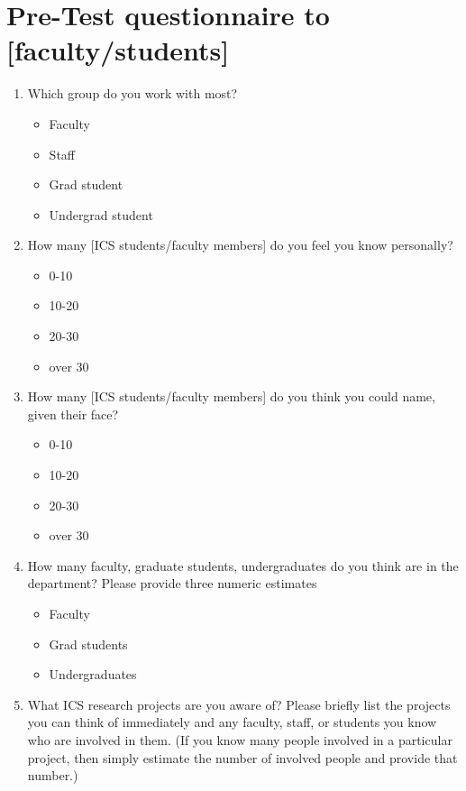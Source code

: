 \section{Pre-Test questionnaire to [faculty/students]}
\label{Pre-Test}
\begin{enumerate}

\item{Which group do you work with most?}
  \begin{itemize}
  \item{Faculty}
  \item{Staff}
  \item{Grad student}
  \item{Undergrad student}
  \end{itemize}

\item{How many [ICS students/faculty members] do you feel you know
  personally?}
  \begin{itemize}
  \item{0-10}
  \item{10-20}
  \item{20-30}
  \item{over 30}
  \end{itemize}

\item{How many [ICS students/faculty members] do you think you could name,
  given their face?}
  \begin{itemize}
  \item{0-10}
  \item{10-20}
  \item{20-30}
  \item{over 30}
  \end{itemize}

\item{How many faculty, graduate students, undergraduates do you think are
  in the department?  Please provide three numeric estimates}
  \begin{itemize}
  \item{Faculty}
  \item{Grad students}
  \item{Undergraduates}
  \end{itemize}

\item{What ICS research projects are you aware of?  Please briefly list the
  projects you can think of immediately and any faculty, staff, or students
  you know who are involved in them. (If you know many people involved in a
  particular project, then simply estimate the number of involved people
  and provide that number.)}


\end{enumerate}
